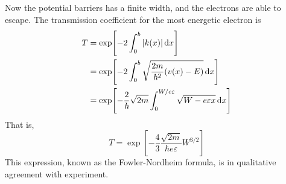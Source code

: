\begin{enumerate}
	Now the potential barriers has a finite width, and the electrons are able to escape. The transmission coefficient for the most energetic electron is
	\begin{align*}
		T &= \exp[-2 \int_{0}^{b} \abs{k(x)} \dd{x}] \\
		 &= \exp[-2 \int_{0}^{b} \sqrt{\frac{2 m}{\hbar^2} \qty(v(x) - E)} \dd{x}] \\
		 &= \exp[- \frac{2}{\hbar} \sqrt{2 m} \int_{0}^{W / e \varepsilon} \sqrt{W - e \varepsilon x} \dd{x}]
	\end{align*}
	That is,
	\begin{equation}
		T = \exp[- \frac{4}{3} \frac{\sqrt{2 m}}{\hbar e \varepsilon} W^{3/2}]
	\end{equation}
	This expression, known as the Fowler-Nordheim formula, is in qualitative agreement with experiment.
\end{enumerate}

